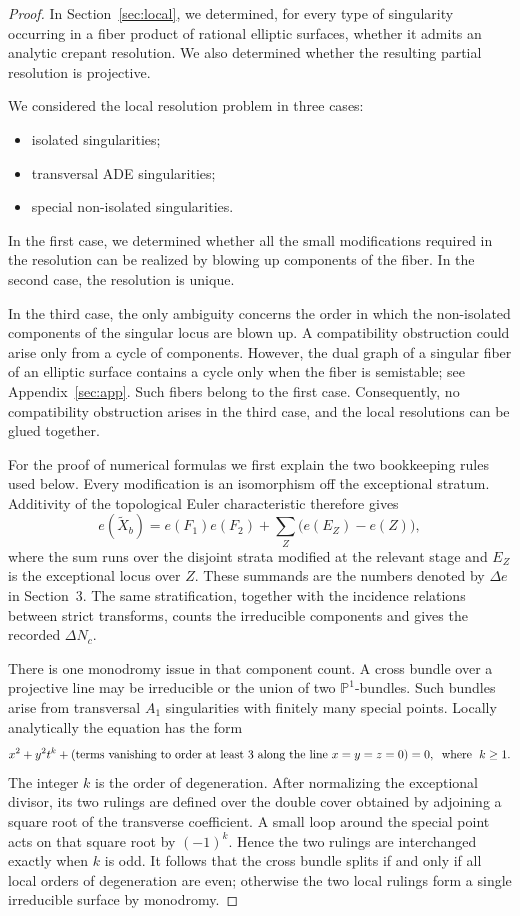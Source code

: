 \documentclass[a4paper]{amsart}
\theoremstyle{plain}
\theoremstyle{definition}
\theoremstyle{remark}
\numberwithin{equation}{section}
\newcommand{\PP}{\mathbb{P}}
\begin{document}
\begin{proof}
	In Section~\ref{sec:local}, we determined, for every type of singularity
	occurring in a fiber product of rational elliptic surfaces, whether it
	admits an analytic crepant resolution. We also determined whether the
	resulting partial resolution is projective.

	We considered the local resolution problem in three cases:
	\begin{itemize}
		\item[(1)] isolated singularities;
		\item[(2)] transversal ADE singularities;
		\item[(3)] special non-isolated singularities.
	\end{itemize}
	In the first case, we determined whether all the small modifications
	required in the resolution can be realized by blowing up components of
	the fiber. In the second case, the resolution is unique.

	In the third case, the only ambiguity concerns the order in which the
	non-isolated components of the singular locus are blown up. A
	compatibility obstruction could arise only from a cycle of components.
	However, the dual graph of a singular fiber of an elliptic surface
	contains a cycle only when the fiber is semistable; see
	Appendix~\ref{sec:app}. Such fibers belong to the first case.
	Consequently, no compatibility obstruction arises in the third case,
	and the local resolutions can be glued together.


For the proof of numerical formulas
we first explain the two bookkeeping rules used below.  Every modification
is an isomorphism off the exceptional stratum.  Additivity of the
topological Euler characteristic therefore gives
\[
e(\widetilde X_b)=e(F_1)e(F_2)+\sum_Z
 \bigl(e(E_Z)-e(Z)\bigr),
\]
where the sum runs over the disjoint strata modified at the relevant
stage and $E_Z$ is the exceptional locus over $Z$.  These summands are the
numbers denoted by $\Delta e$ in Section~3.  The same stratification,
together with the incidence relations between strict transforms, counts
the irreducible components and gives the recorded $\Delta N_c$.

There is one monodromy issue in that component count.  A cross bundle over a projective line may
be irreducible or the union of two $\PP^1$-bundles.  Such bundles arise
from transversal $A_1$ singularities with finitely many special points.
Locally analytically the equation has the form
\[
x^{2}+y^{2}t^{k}+\left(\text{terms vanishing to order at least 3 along the line } x=y=z=0 \right) =0, \;\;\textup{where }\; k\geq 1.
\]
The integer $k$ is the order of degeneration.  After normalizing the
exceptional divisor, its two rulings are defined over the double cover
obtained by adjoining a square root of the transverse coefficient.
A small loop around the special point acts on that square root by
$(-1)^k$.  Hence the two rulings are interchanged exactly when $k$ is
odd.  It follows that the cross bundle splits if and only if all local
orders of degeneration are even; otherwise the two local rulings form a
single irreducible surface by monodromy.


\end{proof}
\end{document}
